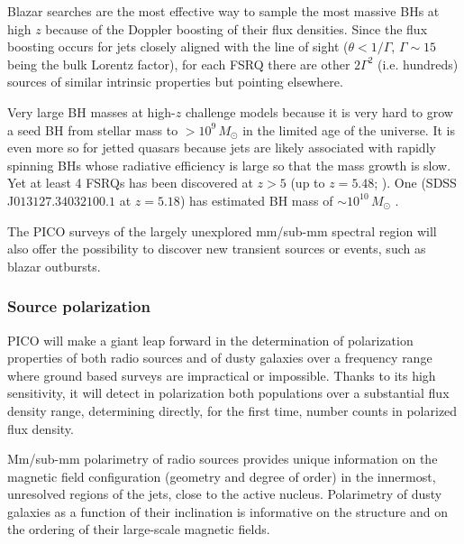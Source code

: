 \documentclass[PICOReport.tex]{subfiles}
\begin{document}
Blazar searches are the most effective way to sample the most massive BHs at
high $z$ because of the Doppler boosting of their flux densities. Since the
flux boosting occurs for jets closely aligned with the line of sight ($\theta <
1/\Gamma$, $\Gamma \sim 15$ being the bulk Lorentz factor), for each FSRQ there
are other $2\Gamma^2$  (i.e. hundreds) sources of similar intrinsic properties
but pointing elsewhere.

Very large BH masses at high-$z$ challenge models because it is very hard to
grow a seed BH from stellar mass to $> 10^9\,M_\odot$ in the limited age of the
universe. It is even more so for jetted quasars because jets are likely
associated with rapidly spinning BHs whose radiative efficiency is large so
that the mass growth is slow. Yet at least 4 FSRQs has been discovered at $z>5$
(up to $z=5.48$; \cite{Romani2004}). One (SDSS J$013127.34032100.1$ at $z =
5.18$) has estimated BH mass of $\sim 10^{10}\,M_\odot$ \cite{Ghisellini2015}.

The PICO surveys of the largely unexplored mm/sub-mm spectral region will also
offer the possibility to discover new transient sources \cite{Metzger2015} or
events, such as blazar outbursts.


\subsubsection{Source polarization}

PICO will make a giant leap forward in the determination of polarization
properties of both radio sources and of dusty galaxies over a frequency range
where ground based surveys are impractical or impossible. Thanks to its high
sensitivity, it will detect in polarization both populations  over a
substantial flux density range, determining directly, for the first time,
number counts in polarized flux density.

Mm/sub-mm polarimetry of radio sources provides unique information on the
magnetic  field configuration (geometry and degree of order) in the innermost,
unresolved regions of the jets, close to the active nucleus. Polarimetry of
dusty galaxies as a function of their inclination is informative on the
structure and on the ordering of their large-scale magnetic fields.
\end{document}
